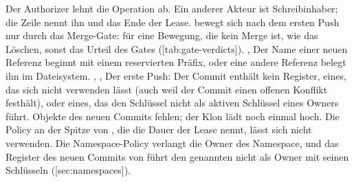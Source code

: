 \startplacetable[title={Die Gründe, aus denen ein Hub eine Referenz eines Ref-Updates ablehnt},
reference=tab:refusal-reasons]
\startxtable[frame=off,option=stretch]
\startxrow[topframe=on,bottomframe=on]
 \stopxcell
{} \stopxcell
\stopxrow
\startxrow
\startxcell {} \stopxcell
\startxcell Der Authorizer lehnt die Operation ab. \stopxcell
\stopxrow
\startxrow
\startxcell {} \stopxcell
\startxcell Ein anderer Akteur ist Schreibinhaber; die Zeile nennt ihn und das Ende der Lease.
\stopxcell
\stopxrow
\startxrow
\startxcell {} \stopxcell
\startxcell {} bewegt sich nach dem ersten Push nur durch das Merge-Gate:
 für eine Bewegung, die kein Merge ist, wie das Löschen, sonst das Urteil des Gates
([tab:gate-verdicts]). \stopxcell
\stopxrow
\startxrow
\startxcell {},  \stopxcell
\startxcell Der Name einer neuen Referenz beginnt mit einem reservierten Präfix, oder eine andere
Referenz belegt ihn im Dateisystem. \stopxcell
\stopxrow
\startxrow
\startxcell {}, ,  \stopxcell
\startxcell Der erste Push: Der Commit enthält kein Register, eines, das sich nicht verwenden
lässt (auch weil der Commit einen offenen Konflikt festhält), oder eines, das den Schlüssel nicht
als aktiven Schlüssel eines Owners führt. \stopxcell
\stopxrow
\startxrow
\startxcell {} \stopxcell
\startxcell Objekte des neuen Commits fehlen; der Klon lädt noch einmal hoch. \stopxcell
\stopxrow
\startxrow
\startxcell {} \stopxcell
\startxcell Die Policy an der Spitze von , die die Dauer der Lease nennt, lässt sich
nicht verwenden. \stopxcell
\stopxrow
\startxrow[bottomframe=on]
\startxcell {} \stopxcell
\startxcell Die Namespace-Policy verlangt die Owner des Namespace, und das Register des neuen
Commits von  führt den genannten nicht als Owner mit seinen Schlüsseln
([sec:namespaces]). \stopxcell
\stopxrow
\stopxtable
\stopplacetable

